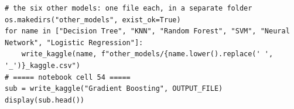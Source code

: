 \documentclass[12pt,a4paper]{article}
\begin{document}
\begin{lstlisting}[style=code]
# the six other models: one file each, in a separate folder
os.makedirs("other_models", exist_ok=True)
for name in ["Decision Tree", "KNN", "Random Forest", "SVM", "Neural Network", "Logistic Regression"]:
    write_kaggle(name, f"other_models/{name.lower().replace(' ', '_')}_kaggle.csv")
# ===== notebook cell 54 =====
sub = write_kaggle("Gradient Boosting", OUTPUT_FILE)
display(sub.head())
\end{lstlisting}
\end{document}
